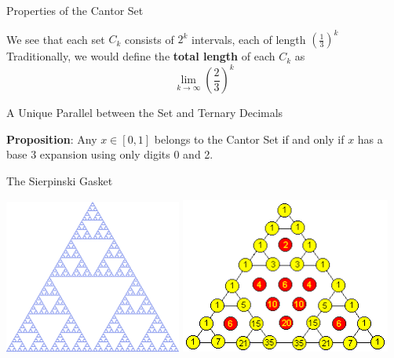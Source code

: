 \documentclass{beamer}
\begin{document}
\begin{frame}{Properties of the Cantor Set}
\begin{center}
We see that each set $C_k$ consists of $2^k$ intervals, each of length $(\frac{1}{3})^k$\\ \vspace{1em}
Traditionally, we would define the \textbf{total length} of each $C_k$ as $$\lim_{k\to\infty} (\frac{2}{3})^k$$
\end{center}
\end{frame}

\begin{frame}{A Unique Parallel between the Set and Ternary Decimals}
\begin{center}
\textbf{Proposition}: Any $x \in [0,1]$ belongs to the Cantor Set if and only if $x$ has a base 3 expansion using only digits 0 and 2.
\end{center}
\end{frame}

\begin{frame}{The Sierpinski Gasket}
\begin{center}
\includegraphics[scale=.5]{triangle.png} \hspace{2em}
\includegraphics[scale=0.5]{pascal.png}
\end{center}
\end{frame}
\end{document}
